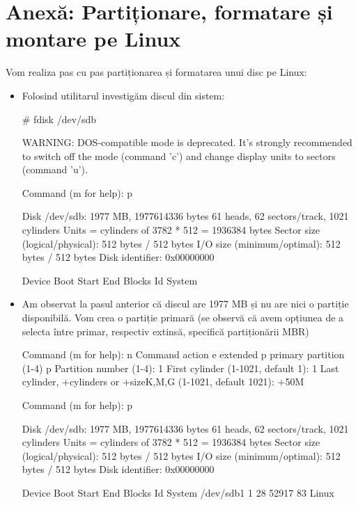 \section{Anexă: Partiționare, formatare și montare pe Linux}
\label{sec:storage-partitionare}

Vom realiza pas cu pas partiționarea și formatarea unui disc pe Linux:

\begin{itemize}
	\item Folosind utilitarul  investigăm discul 
		din sistem:

\begin{screen}
# fdisk /dev/sdb


WARNING: DOS-compatible mode is deprecated. It's strongly recommended to
         switch off the mode (command 'c') and change display units to
         sectors (command 'u').


Command (m for help): p


Disk /dev/sdb: 1977 MB, 1977614336 bytes
61 heads, 62 sectors/track, 1021 cylinders
Units = cylinders of 3782 * 512 = 1936384 bytes
Sector size (logical/physical): 512 bytes / 512 bytes
I/O size (minimum/optimal): 512 bytes / 512 bytes
Disk identifier: 0x00000000


   Device Boot      Start         End      Blocks   Id  System
\end{screen}

	\item Am observat la pasul anterior că discul are 1977 MB și nu are nici
		o partiție disponibilă. Vom crea o partiție primară (se observă
		că avem opțiunea de a selecta între primar, respectiv extinsă,
		specifică partiționării MBR)

\begin{screen}
Command (m for help): n
Command action
   e   extended
   p   primary partition (1-4)
p
Partition number (1-4): 1
First cylinder (1-1021, default 1): 1
Last cylinder, +cylinders or +size{K,M,G} (1-1021, default 1021): +50M


Command (m for help): p


Disk /dev/sdb: 1977 MB, 1977614336 bytes
61 heads, 62 sectors/track, 1021 cylinders
Units = cylinders of 3782 * 512 = 1936384 bytes
Sector size (logical/physical): 512 bytes / 512 bytes
I/O size (minimum/optimal): 512 bytes / 512 bytes
Disk identifier: 0x00000000


   Device Boot      Start         End      Blocks   Id  System
/dev/sdb1               1          28       52917   83  Linux
\end{screen}


\end{itemize}

